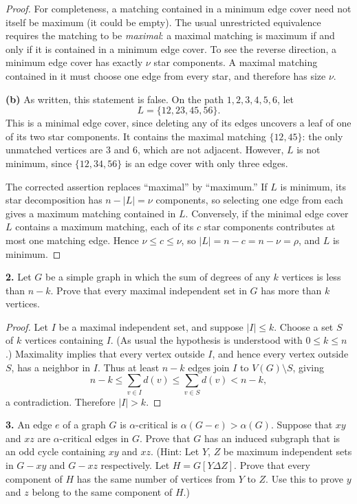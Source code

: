 \documentclass[12pt]{amsart}
\theoremstyle{conjecture}
\theoremstyle{definition}
\theoremstyle{question}
\theoremstyle{theorem}
\begin{document}
\begin{proof}
    For completeness, a matching contained in a minimum edge cover need
    not itself be maximum (it could be empty). The usual unrestricted
    equivalence requires the matching to be \emph{maximal}: a maximal
    matching is maximum if and only if it is contained in a minimum edge
    cover. To see the reverse direction, a minimum edge cover has exactly
    $\nu$ star components. A maximal matching contained in it must choose
    one edge from every star, and therefore has size $\nu$.

    \smallskip
    \noindent\textbf{(b)} As written, this statement is false. On the path
    $1,2,3,4,5,6$, let
    \[
       L=\{12,23,45,56\}.
    \]
    This is a minimal edge cover, since deleting any of its edges uncovers
    a leaf of one of its two star components. It contains the maximal
    matching $\{12,45\}$: the only unmatched vertices are $3$ and $6$,
    which are not adjacent. However, $L$ is not minimum, since
    $\{12,34,56\}$ is an edge cover with only three edges.

    The corrected assertion replaces ``maximal'' by ``maximum.'' If $L$
    is minimum, its star decomposition has $n-|L|=\nu$ components, so
    selecting one edge from each gives a maximum matching contained in
    $L$. Conversely, if the minimal edge cover $L$ contains a maximum
    matching, each of its $c$ star components contributes at most one
    matching edge. Hence $\nu\le c\le\nu$, so
    $|L|=n-c=n-\nu=\rho$, and $L$ is minimum.
    \end{proof}

    \noindent\textbf{2.} Let $G$ be a simple graph in which the sum of degrees of any $k$ vertices
    is less than $n-k$.
    Prove that every maximal independent set in $G$ has more than $k$ vertices.

    \begin{proof}

    Let $I$ be a maximal independent set, and suppose $|I|\le k$.
    Choose a set $S$ of $k$ vertices containing $I$. (As usual the
    hypothesis is understood with $0\le k\le n$.) Maximality implies
    that every vertex outside $I$, and hence every vertex outside $S$,
    has a neighbor in $I$. Thus at least $n-k$ edges join $I$ to
    $V(G)\setminus S$, giving
    \[
       n-k\le\sum_{v\in I}d(v)\le\sum_{v\in S}d(v)<n-k,
    \]
    a contradiction. Therefore $|I|>k$.
    \end{proof}

    \noindent\textbf{3.} An edge $e$ of a graph $G$ is $\alpha$-critical is $\alpha(G - e) > \alpha(G)$.
    Suppose that $xy$ and $xz$ are $\alpha$-critical edges in $G$.
    Prove that $G$ has an induced subgraph that is an odd cycle containing $xy$ and $xz$.
    (Hint: Let $Y$, $Z$ be maximum independent sets in $G-xy$ and $G-xz$ respectively.
    Let $H = G[Y\Delta Z]$.
    Prove that every component of $H$ has the same number of vertices from $Y$ to $Z$.
    Use this to prove $y$ and $z$ belong to the same component of $H$.)
\end{document}
